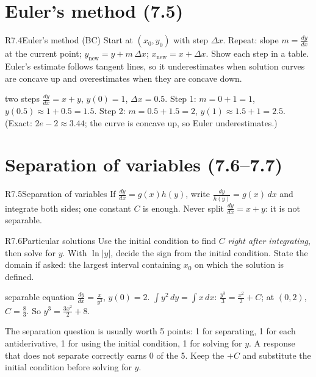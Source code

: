 \documentclass{apcalc}
\begin{document}
\section{Euler's method (7.5)}

\begin{rulebox}{R7.4}{Euler's method (BC)}
Start at $(x_0,y_0)$ with step $\Delta x$. Repeat: slope $m=\frac{dy}{dx}$ at the current point; $y_{\text{new}}=y+m\,\Delta x$; $x_{\text{new}}=x+\Delta x$. Show each step in a table. Euler's estimate follows tangent lines, so it underestimates when solution curves are concave up and overestimates when they are concave down.
\end{rulebox}

\begin{example}{two steps}
$\frac{dy}{dx}=x+y$, $y(0)=1$, $\Delta x=0.5$. Step 1: $m=0+1=1$, $y(0.5)\approx1+0.5=1.5$. Step 2: $m=0.5+1.5=2$, $y(1)\approx1.5+1=2.5$. (Exact: $2e-2\approx3.44$; the curve is concave up, so Euler underestimates.) 
\end{example}

\section{Separation of variables (7.6--7.7)}

\begin{rulebox}{R7.5}{Separation of variables}
If $\frac{dy}{dx}=g(x)h(y)$, write $\frac{dy}{h(y)}=g(x)\,dx$ and integrate both sides; one constant $C$ is enough. Never split $\frac{dy}{dx}=x+y$: it is not separable.
\end{rulebox}

\begin{rulebox}{R7.6}{Particular solutions}
Use the initial condition to find $C$ \emph{right after integrating}, then solve for $y$. With $\ln|y|$, decide the sign from the initial condition. State the domain if asked: the largest interval containing $x_0$ on which the solution is defined.
\end{rulebox}

\begin{example}{separable equation}
$\frac{dy}{dx}=\frac{x}{y^2}$, $y(0)=2$. $\int y^2\,dy=\int x\,dx$: $\frac{y^3}{3}=\frac{x^2}{2}+C$; at $(0,2)$, $C=\frac83$. So $y^3=\frac{3x^2}{2}+8$. 
\end{example}

\begin{frqtip}
The separation question is usually worth 5 points: 1 for separating, 1 for each antiderivative, 1 for using the initial condition, 1 for solving for $y$. A response that does not separate correctly earns 0 of the 5. Keep the $+C$ and substitute the initial condition before solving for $y$.
\end{frqtip}
\end{document}
